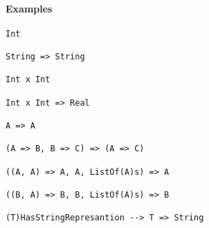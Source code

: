 \documentclass{article}
\begin{document}
\paragraph{Examples}

\begin{verbatim}
Int

String => String 

Int x Int 

Int x Int => Real

A => A

(A => B, B => C) => (A => C)

((A, A) => A, A, ListOf(A)s) => A

((B, A) => B, B, ListOf(A)s) => B

(T)HasStringRepresantion --> T => String
\end{verbatim}
\end{document}

